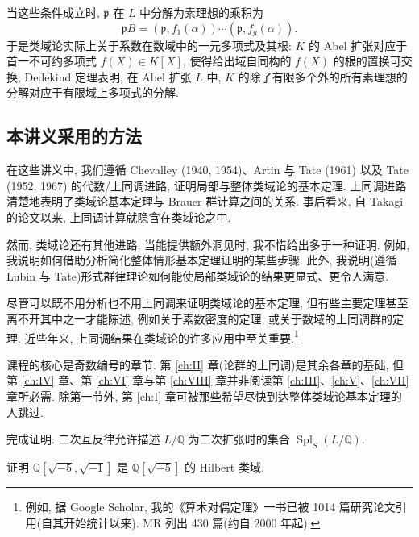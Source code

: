 当这些条件成立时, $\mathfrak{p}$ 在 $L$ 中分解为素理想的乘积为
\[
\mathfrak{p}B = (\mathfrak{p}, f_{1}(\alpha)) \cdots (\mathfrak{p}, f_{g}(\alpha)).
\]
于是类域论实际上关于系数在数域中的一元多项式及其根: $K$ 的 Abel 扩张对应于首一不可约多项式 $f(X) \in K[X]$, 使得给出域自同构的 $f(X)$ 的根的置换可交换; Dedekind 定理表明, 在 Abel 扩张 $L$ 中, $K$ 的除了有限多个外的所有素理想的分解对应于有限域上多项式的分解.

\subsection*{本讲义采用的方法}

在这些讲义中, 我们遵循 Chevalley (1940, 1954)\cite{Chevalley1940}\cite{Chevalley1954}、Artin 与 Tate (1961)\cite{ArtinTate1961} 以及 Tate (1952, 1967)\cite{Tate1952}\cite{Tate1967} 的代数/上同调进路, 证明局部与整体类域论的基本定理. 上同调进路清楚地表明了类域论基本定理与 Brauer 群计算之间的关系. 事后看来, 自 Takagi 的论文以来, 上同调计算就隐含在类域论之中.

然而, 类域论还有其他进路, 当能提供额外洞见时, 我不惜给出多于一种证明. 例如, 我说明如何借助分析简化整体情形基本定理证明的某些步骤. 此外, 我说明(遵循 Lubin 与 Tate)形式群律理论如何能使局部类域论的结果更显式、更令人满意.

尽管可以既不用分析也不用上同调来证明类域论的基本定理, 但有些主要定理甚至离不开其中之一才能陈述, 例如关于素数密度的定理, 或关于数域的上同调群的定理. 近些年来, 上同调结果在类域论的许多应用中至关重要.\footnote{例如, 据 Google Scholar, 我的《算术对偶定理》一书已被 1014 篇研究论文引用(自其开始统计以来). MR 列出 430 篇(约自 2000 年起).}

课程的核心是奇数编号的章节. 第 \ref{ch:II} 章(论群的上同调)是其余各章的基础, 但第 \ref{ch:IV} 章、第 \ref{ch:VI} 章与第 \ref{ch:VIII} 章并非阅读第 \ref{ch:III}、\ref{ch:V}、\ref{ch:VII} 章所必需. 除第一节外, 第 \ref{ch:I} 章可被那些希望尽快到达整体类域论基本定理的人跳过.

\begin{exercise}\label{ex:0.11}
完成证明: 二次互反律允许描述 $L/\mathbb{Q}$ 为二次扩张时的集合 $\operatorname{Spl}_{S}(L/\mathbb{Q})$.
\end{exercise}

\begin{exercise}\label{ex:0.12}
证明 $\mathbb{Q}[\sqrt{-5}, \sqrt{-1}]$ 是 $\mathbb{Q}[\sqrt{-5}]$ 的 Hilbert 类域.
\end{exercise}

